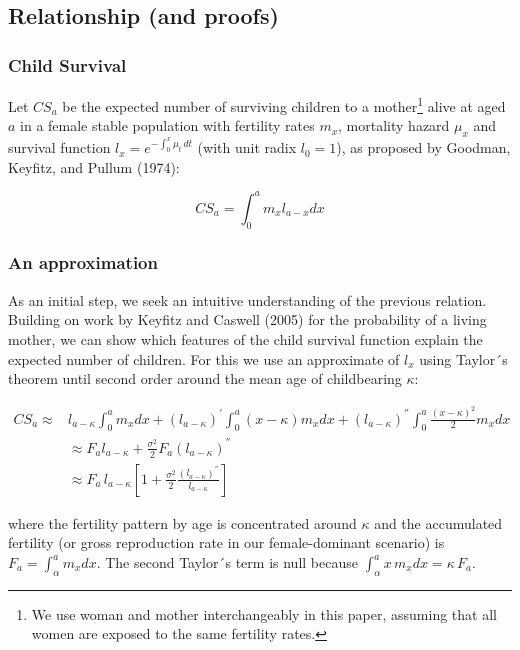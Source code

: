 \documentclass[
]{article}
\begin{document}
\hypertarget{relationship-and-proofs}{%
\subsection{Relationship (and proofs)}\label{relationship-and-proofs}}

\hypertarget{child-survival}{%
\subsubsection{Child Survival}\label{child-survival}}

Let \(CS_a\) be the expected number of surviving children to a
mother\footnote{We use woman and mother interchangeably in this paper,
  assuming that all women are exposed to the same fertility rates.}
alive at aged \(a\) in a female stable population with fertility rates
\(m_{x}\), mortality hazard \(\mu_{x}\) and survival function
\(l_x=e^{-\int_{0}^{x}{\mu_t}\,dt}\) (with unit radix \(l_0=1\)), as
proposed by Goodman, Keyfitz, and Pullum (1974):

\[CS_a = \int_{0}^a{m_{x}l_{a-x}dx}\]

\hypertarget{an-approximation}{%
\subsubsection{An approximation}\label{an-approximation}}

As an initial step, we seek an intuitive understanding of the previous
relation. Building on work by Keyfitz and Caswell (2005) for the
probability of a living mother, we can show which features of the child
survival function explain the expected number of children. For this we
use an approximate of \(l_x\) using Taylor´s theorem until second order
around the mean age of childbearing \(\kappa\):

\[
\begin{aligned}
CS_a \approx & l_{a-\kappa} \int_{0}^a{m_{x}dx}+(l_{a-\kappa})^{'}\int_{0}^a{(x-\kappa)m_{x}dx}+
(l_{a-\kappa})^{''}\int_{0}^a{\frac{(x-\kappa)^2}{2} m_{x}dx}\\
  & \approx F_a l_{a-\kappa} + \frac{\sigma^2}{2}F_a (l_{a-\kappa})^{''}\\
  & \approx F_a \, l_{a-\kappa}[1+\frac{\sigma^2}{2}\frac{(l_{a-\kappa})^{''}}{l_{a-\kappa}}]
\end{aligned}
\]

where the fertility pattern by age is concentrated around \(\kappa\) and
the accumulated fertility (or gross reproduction rate in our
female-dominant scenario) is \(F_a = \int_{\alpha}^a{m_{x}dx}\). The
second Taylor´s term is null because
\(\int_{\alpha}^a{x \, m_{x}dx} = \kappa \, F_a\).
\end{document}
